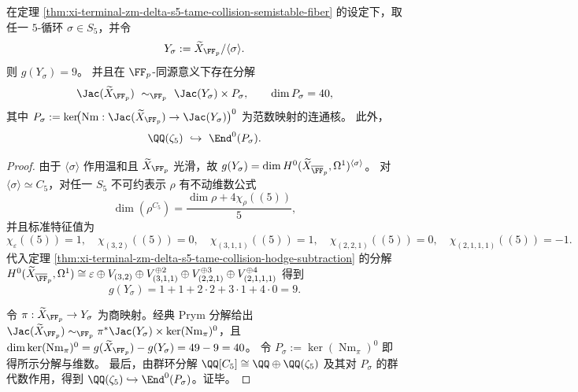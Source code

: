 \begin{theorem}\label{thm:xi-terminal-zm-delta-s5-tame-collision-c5-quotient-prym}
在定理 \ref{thm:xi-terminal-zm-delta-s5-tame-collision-semistable-fiber} 的设定下，取任一 \(5\)-循环 \(\sigma\in S_5\)，并令
\[
Y_\sigma:=\widetilde X_{\FF_p}/\langle\sigma\rangle.
\]
则 \(g(Y_\sigma)=9\)。
并且在 \(\FF_p\)-同源意义下存在分解
\[
\Jac(\widetilde X_{\FF_p})\ \sim_{\FF_p}\ \Jac(Y_\sigma)\times P_\sigma,
\qquad
\dim P_\sigma = 40,
\]
其中
\(
P_\sigma:=\ker\!\bigl(\operatorname{Nm}:\Jac(\widetilde X_{\FF_p})\to\Jac(Y_\sigma)\bigr)^0
\)
为范数映射的连通核。
此外，
\[
\QQ(\zeta_5)\ \hookrightarrow\ \End^0(P_\sigma).
\]
\end{theorem}
\begin{proof}
由于 \(\langle\sigma\rangle\) 作用温和且 \(\widetilde X_{\FF_p}\) 光滑，故
\(
g(Y_\sigma)=\dim H^0(\widetilde X_{\overline{\FF}_p},\Omega^1)^{\langle\sigma\rangle}
\)。
对 \(\langle\sigma\rangle\simeq C_5\)，对任一 \(S_5\) 不可约表示 \(\rho\) 有不动维数公式
\[
\dim(\rho^{C_5})=\frac{\dim\rho+4\chi_\rho((5))}{5},
\]
并且标准特征值为
\[
\chi_\varepsilon((5))=1,\quad
\chi_{(3,2)}((5))=0,\quad
\chi_{(3,1,1)}((5))=1,\quad
\chi_{(2,2,1)}((5))=0,\quad
\chi_{(2,1,1,1)}((5))=-1.
\]
代入定理 \ref{thm:xi-terminal-zm-delta-s5-tame-collision-hodge-subtraction} 的分解
\(
H^0(\widetilde X_{\overline{\FF}_p},\Omega^1)\cong
\varepsilon\oplus V_{(3,2)}\oplus V_{(3,1,1)}^{\oplus 2}\oplus V_{(2,2,1)}^{\oplus 3}\oplus V_{(2,1,1,1)}^{\oplus 4}
\)
得到
\[
g(Y_\sigma)=1+1+2\cdot 2+3\cdot 1+4\cdot 0=9.
\]
\par
令 \(\pi:\widetilde X_{\FF_p}\to Y_\sigma\) 为商映射。经典 Prym 分解给出
\(
\Jac(\widetilde X_{\FF_p})\sim_{\FF_p}\pi^*\Jac(Y_\sigma)\times \ker(\operatorname{Nm}_\pi)^0
\)，且
\(
\dim\ker(\operatorname{Nm}_\pi)^0=g(\widetilde X_{\FF_p})-g(Y_\sigma)=49-9=40
\)。
令 \(P_\sigma:=\ker(\operatorname{Nm}_\pi)^0\) 即得所示分解与维数。
最后，由群环分解
\(
\QQ[C_5]\cong \QQ\oplus \QQ(\zeta_5)
\)
及其对 \(P_\sigma\) 的群代数作用，得到 \(\QQ(\zeta_5)\hookrightarrow \End^0(P_\sigma)\)。证毕。
\end{proof}

